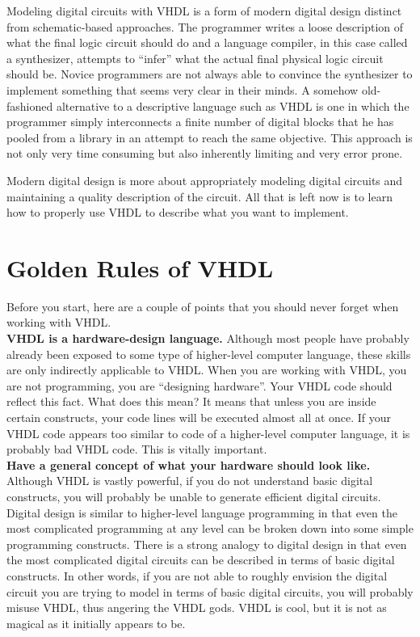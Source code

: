 Modeling digital circuits with VHDL is a form of modern digital design distinct from schematic-based approaches. The programmer writes a loose description of what the final logic circuit should do and a language compiler, in this case called a synthesizer, attempts to ``infer'' what the actual final physical logic circuit should be. Novice programmers are not always able to convince the synthesizer to implement something that seems very clear in their minds.
A somehow old-fashioned alternative to a descriptive language such as VHDL is one in which the programmer simply interconnects a finite number of digital blocks that he has pooled from a library in an attempt to reach the same objective. This approach is not only very time consuming but also inherently limiting and very error prone.

Modern digital design is more about appropriately modeling digital circuits and maintaining a quality description of the circuit. All that is left now is to learn how to properly use VHDL to describe what you want to implement.

\section{Golden Rules of VHDL}
Before you start, here are a couple of points that you should never forget when working with VHDL.\\

\noindent
\textbf{VHDL is a hardware-design language.} Although most people have probably already been exposed to some type of higher-level computer language, these skills are only indirectly applicable to VHDL. When you are working with VHDL, you are not programming, you are ``designing hardware''. Your VHDL code should reflect this fact. What does this mean? It means that unless you are inside certain constructs, your code lines will be executed almost all at once. If your VHDL code appears too similar to code of a higher-level computer language, it is probably bad VHDL code. This is vitally important.\\

\noindent
\textbf{Have a general concept of what your hardware should look like.} Although VHDL is vastly powerful, if you do not understand basic digital constructs, you will probably be unable to generate efficient digital circuits. Digital design is similar to higher-level language programming in that even the most complicated programming at any level can be broken down into some simple programming constructs. There is a strong analogy to digital design in that even the most complicated digital circuits can be described in terms of basic digital constructs. In other words, if you are not able to roughly envision the digital circuit you are trying to model in terms of basic digital circuits, you will probably misuse VHDL, thus angering the VHDL gods. VHDL is cool, but it is not as magical as it initially appears to be.

